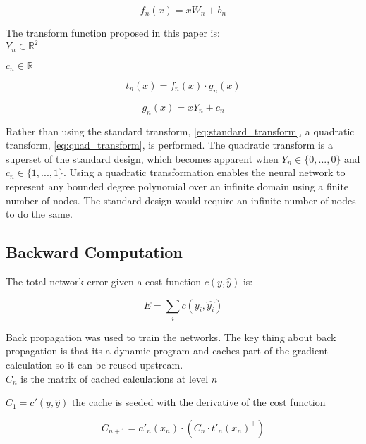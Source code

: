 \documentclass{article}
\begin{document}
\begin{equation} \label{eq:f}
f_n(x) = x W_n + b_n
\end{equation}

The transform function proposed in this paper is:\\

$Y_n \in \mathbb{R}^2$

$c_n \in \mathbb{R}$

\begin{equation} \label{eq:quad_transform}
t_n(x) =  f_n(x) \cdot g_n(x)
\end{equation}

\begin{equation} \label{eq:g}
g_n(x) = x Y_n + c_n
\end{equation}

Rather than using the standard transform, \eqref{eq:standard_transform}, a quadratic transform, \eqref{eq:quad_transform}, is performed. The quadratic transform is a superset of the standard design, which becomes apparent when $Y_n \in \{0,...,0\}$ and $c_n \in \{1, ..., 1\}$. Using a quadratic transformation enables the neural network to represent any bounded degree polynomial over an infinite domain using a finite number of nodes. The standard design would require an infinite number of nodes to do the same.

\subsection{Backward Computation}

The total network error given a cost function $c(y, \hat{y})$ is:

\begin{equation} \label{eq:total_error}
E = \sum_i c(y_i, \hat{y_i})
\end{equation}

Back propagation was used to train the networks. The key thing about back propagation is that its a dynamic program and caches part of the gradient calculation so it can be reused upstream.\\

$C_n$ is the matrix of cached calculations at level $n$

$C_1 = c'(y, \hat{y})$ the cache is seeded with the derivative of the cost function

\begin{equation} \label{eq:cache_update}
C_{n+1} = a'_n(x_n) \cdot (C_n \cdot t'_n(x_n)^\top)
\end{equation}
\end{document}
